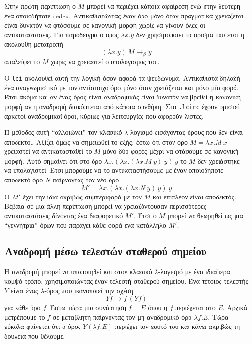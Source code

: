 \documentclass[a4paper,11pt]{article}
\newcommand{\la}{$\lambda$}
\newcommand{\lci}{\texttt{\en{lci}}}
\newcommand{\qm}[1]{\en{``}#1\en{''}}
\newcommand{\kwd}[1]{\en{\texttt{#1}}}
\newcommand{\en}[1]{\textlatin{#1}}
\begin{document}
Στην πρώτη περίπτωση ο $M$ μπορεί να περιέχει κάποια αφαίρεση ενώ στην δεύτερη 
ένα οποιοδήποτε \en{redex}. Αντικαθιστώντας έναν όρο μόνο όταν πραγματικά χρειάζεται είναι δυνατόν
να φτάσουμε σε κανονική μορφή χωρίς να γίνουν όλες οι αντικαταστάσεις. Για παράδειγμα
ο όρος $\lambda x.y$ δεν χρησιμοποιεί το όρισμά του έτσι η ακόλουθη μετατροπή
\[ (\lambda x.y)\ M \rightarrow_\beta y \]
απαλείφει το $M$ χωρίς να χρειαστεί ο υπολογισμός του.

Ο \lci{} ακολουθεί αυτή την λογική όσον αφορά τα ψευδώνυμα. Αντικαθιστά δηλαδή ένα
αναγνωριστικό με τον αντίστοιχο όρο μόνο όταν χρειάζεται και μόνο μία φορά. Έτσι
ακόμα και αν ένας όρος είναι αναδρομικός είναι δυνατόν να βρεθεί η κανονική μορφή
αν η αναδρομή διακόπτεται από κάποια συνθήκη. Στο \kwd{.lcirc} έχουν οριστεί
αρκετοί αναδρομικοί όροι, κύριως για λειτουργίες που αφορούν λίστες.

Η μέθοδος αυτή \qm{αλλοιώνει} τον κλασικό \la-λογισμό εισάγοντας όρους που δεν είναι
αποδεκτοί. Αξίζει όμως να σημειωθεί το εξής: έστω ότι στον όρο
$M = \lambda x.M\ x$ χρειαστεί να αντικατασταθεί το $Μ$ μόνο δύο φορές μέχρι να 
φτάσουμε σε κανονική μορφή. Αυτό σημαίνει ότι στο όρο
$ \lambda x.(\lambda x.(\lambda x.M\ y)\ y)\ y $
το $M$ δεν χρειάστηκε να υπολογιστεί. Έτσι μπορούμε να το αντικαταστήσουμε με
έναν οποιοδήποτε αποδεκτό όρο $N$ παίρνοντας τον νέο όρο
\[ Μ' = \lambda x.(\lambda x.(\lambda x.Ν\ y)\ y)\ y \]
Ο $M'$ έχει την ίδια ακριβώς συμπεριφορά με τον $M$ και επιπλέον είναι αποδεκτός.
Βέβαια σε μια άλλη περίπτωση μπορεί να χρειαζόντουσαν περισσότερες
αντικαταστάσεις δίνοντας ένα διαφορετικό $M'$. Έτσι ο $M$ μπορεί να θεωρηθεί ως μια
\qm{γεννήτρια} όρων που παράγει κάθε φορά ένα κατάλληλο $M'$.

\subsection{Αναδρομή μέσω τελεστών σταθερού σημείου}
Η αναδρομή μπορεί να υποποιηθεί και στον κλασικό \la-λογισμό με ένα ιδιαίτερα
κομψό τρόπο, χρησιμοποιώντας έναν τελεστή σταθερού σημείου. Ένα τέτοιος τελεστής $Y$
είναι ένας \la-όρος που ικανοποιεί την σχέση
\[ Y f \rightarrow f\ (Y f) \]
για κάθε όρο $f$. Έστω τώρα μια συνάρτηση $f=E$ όπου η $f$ περιέχεται στο $E$. Αρχικά
μετρέπουμε το $f$ σε μεταβλητή παίρνοντας τον μη αναδρομικό όρο $\lambda f.E$.
Τώρα εύκολα φαίνεται ότι ο όρος $Y (\lambda f.E)$ περιέχει τον εαυτό του και κάνει
ακριβώς τη δουλειά που θέλουμε.
\end{document}
